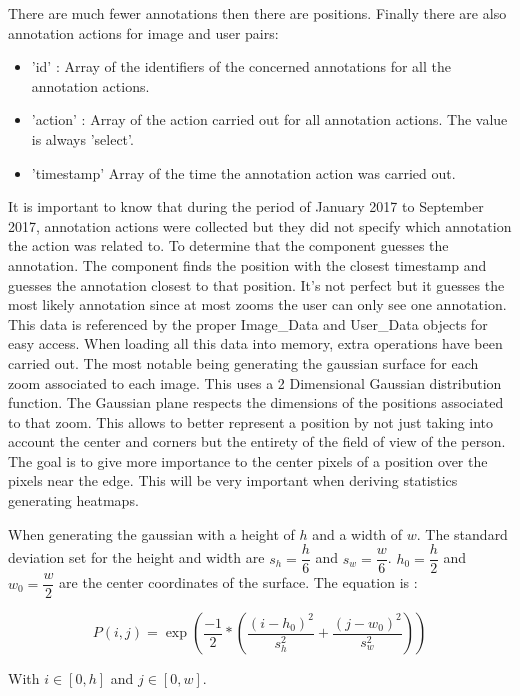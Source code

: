 \documentclass[a4paper,11pt]{report}
\numberwithin{figure}{section} %
\begin{document}
    There are much fewer annotations then there are positions. Finally there are also annotation actions for image and user pairs:
    \begin{itemize}
        \item[\textbullet] 'id' : Array of the identifiers of the concerned annotations for all the annotation actions.
        \item[\textbullet] 'action' : Array of the action carried out for all annotation actions. The value is always 'select'.
        \item[\textbullet] 'timestamp' Array of the time the annotation action was carried out.
    \end{itemize}
    It is important to know that during the period of January 2017 to September 2017, annotation actions were collected but they did not specify which annotation the action was related to.
    To determine that the component guesses the annotation. The component finds the position with the closest timestamp and guesses the annotation closest to that position. It's not perfect but it guesses the most likely annotation since at most zooms the user can only see one annotation.\\


    This data is referenced by the proper Image\_Data and User\_Data objects for easy access. When loading all this data into memory, extra operations have been carried out. The most notable being generating the gaussian surface for each zoom associated to each image. This uses a 2 Dimensional Gaussian distribution function.
    The Gaussian plane respects the dimensions of the positions associated to that zoom. This allows to better represent a position by not just taking into account the center and corners but the entirety of the field of view of the person.
    The goal is to give more importance to the center pixels of a position over the pixels near the edge. This will be very important when deriving statistics generating heatmaps.

    When generating the gaussian with a height of $h$ and a width of $w$. The standard deviation set for the height and width are $s_h = \dfrac{h}{6}$ and $s_w = \dfrac{w}{6}$.
    $h_0 = \dfrac{h}{2}$ and $w_0 = \dfrac{w}{2}$ are the center coordinates of the surface. The equation is :

        $$P(i,j) = \exp(\dfrac{-1}{2}*(\dfrac{(i - h_0)^2}{s_h^2} + \dfrac{(j - w_0)^2}{s_w^2}))$$

    With $i \in [0, h]$ and $j \in [0, w]$.
\end{document}
